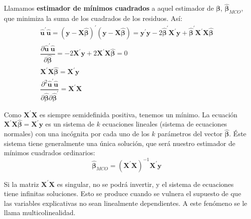 Llamamos \textbf{estimador de m\'inimos cuadrados} a aquel estimador
de $\boldsymbol{\beta}$, $\hat{\boldsymbol{\beta}}_{MCO}$, que minimiza
la suma de los cuadrados de los residuos. As\'i:
\begin{equation*}
\begin{array}{c}
\hat{\boldsymbol{u}}^{\prime}\hat{\boldsymbol{u}}=\left(\boldsymbol{y}-\boldsymbol{X}\hat{\boldsymbol{\beta}}\right)^{\prime}\left(\boldsymbol{y}-\boldsymbol{X}\hat{\boldsymbol{\beta}}\right)=\boldsymbol{y}^{\prime}\boldsymbol{y}-2\hat{\boldsymbol{\beta}}^{\prime}\boldsymbol{X}^{\prime}\boldsymbol{y}+\hat{\boldsymbol{\beta}}^{\prime}\boldsymbol{X}^{\prime}\boldsymbol{X}\hat{\boldsymbol{\beta}}\\
\dfrac{\partial\hat{\boldsymbol{u}}^{\prime}\hat{\boldsymbol{u}}}{\partial\hat{\boldsymbol{\beta}}}=-2\boldsymbol{X}^{\prime}\boldsymbol{y}+2\boldsymbol{X}^{\prime}\boldsymbol{X}\hat{\boldsymbol{\beta}}=0\\
\boldsymbol{X}^{\prime}\boldsymbol{X}\hat{\boldsymbol{\beta}}=\boldsymbol{X}^{\prime}\boldsymbol{y}\\
\dfrac{\partial^{2}\hat{\boldsymbol{u}}^{\prime}\hat{\boldsymbol{u}}}{\partial\hat{\boldsymbol{\beta}}\partial\hat{\boldsymbol{\beta}}^{\prime}}=\boldsymbol{X}^{\prime}\boldsymbol{X}
\end{array}
\end{equation*}


Como $\boldsymbol{X}^{\prime}\boldsymbol{X}$ es siempre semidefinida positiva,
tenemos un m\'inimo. La ecuaci\'on $\boldsymbol{X}^{\prime}\boldsymbol{X}\hat{\boldsymbol{\beta}}=\boldsymbol{X}^{\prime}\boldsymbol{y}$
es un sistema de $k$ ecuaciones lineales (sistema de ecuaciones normales)
con una inc\'ognita por cada uno de los $k$ par\'ametros del vector $\hat{\boldsymbol{\beta}}$.
\'Este sistema tiene generalmente una \'unica soluci\'on, que ser\'a nuestro
estimador de m\'inimos cuadrados ordinarios:
\begin{equation*}
\hat{\boldsymbol{\beta}}_{MCO}=\left(\boldsymbol{X}^{\prime}\boldsymbol{X}\right)^{-1}\boldsymbol{X}^{\prime}\boldsymbol{y}
\end{equation*}


Si la matriz $\boldsymbol{X}^{\prime}\boldsymbol{X}$ es singular, no se podr\'a
invertir, y el sistema de ecuaciones tiene infinitas soluciones. Esto
se produce cuando se vulnera el supuesto de que las variables explicativas
no sean linealmente dependientes. A este fen\'omeno se le llama multicolinealidad.

